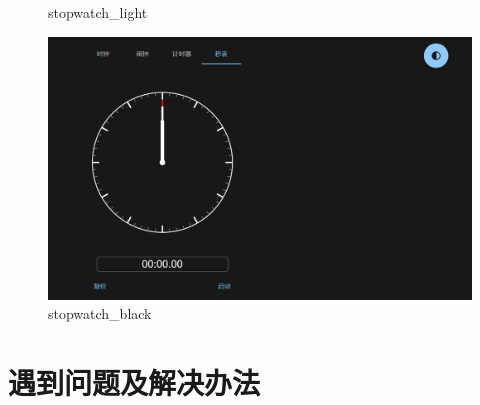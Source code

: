 \documentclass[a4paper,11pt]{article}
\begin{document}
\begin{figure}[!h]
\begin{minipage}{0.48\textwidth}
        \caption{stopwatch\_light}
    \end{minipage}
    \begin{minipage}{0.48\textwidth}
        \centering
        \includegraphics[width=\linewidth]{image/stopwatch_black.png}
        \caption{stopwatch\_black}
    \end{minipage}
\end{figure}
\clearpage
\section{遇到问题及解决办法}
\end{document}
